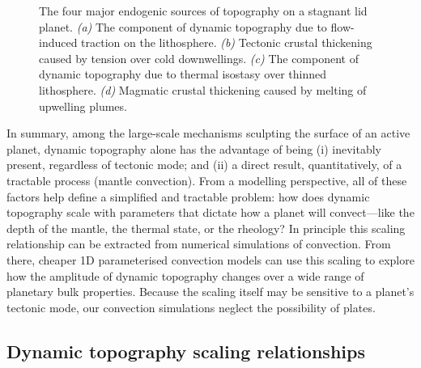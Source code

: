 \documentclass[trackchanges]{aastex63}
\begin{document}
\begin{figure}
          
\caption{The four major endogenic sources of topography on a stagnant lid planet. \textit{(a)} The component of dynamic topography due to flow-induced traction on the lithosphere. \textit{(b)} Tectonic crustal thickening caused by tension over cold downwellings. \textit{(c)} The component of dynamic topography due to thermal isostasy over thinned lithosphere. \textit{(d)} Magmatic crustal thickening caused by melting of upwelling plumes.}
\label{fig:topography-schematic}
\end{figure}

In summary, among the large-scale mechanisms sculpting the surface of an active planet, dynamic topography alone has the advantage of being (i) inevitably present, regardless of tectonic mode; and (ii) a direct result, quantitatively, of a tractable process (mantle convection). From a modelling perspective, all of these factors help define a simplified and tractable problem: how does dynamic topography scale with parameters that dictate how a planet will convect---like the depth of the mantle, the thermal state, or the rheology? In principle this scaling relationship can be extracted from numerical simulations of convection. From there, cheaper 1D parameterised convection models can use this scaling to explore how the amplitude of dynamic topography changes over a wide range of planetary bulk properties. Because the scaling itself may be sensitive to a planet's tectonic mode, our convection simulations neglect the possibility of plates.

\subsection{Dynamic topography scaling relationships}\label{sec:intro-scaling}
\end{document}
